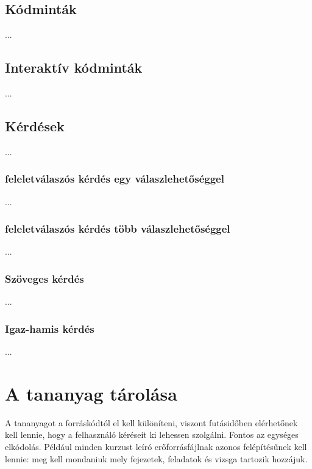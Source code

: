 \documentclass[12pt,a4paper]{article}
\begin{document}
	\subsection{Kódminták}
	
	...
	
	
	\subsection{Interaktív kódminták}
	
	...
	
	
	\subsection{Kérdések}\label{kerdesek}
	
	...
	
	\subsubsection{feleletválaszós kérdés egy válaszlehetőséggel}
	
	...
	
	\subsubsection{feleletválaszós kérdés több válaszlehetőséggel}
	
	...
	
	\subsubsection{Szöveges kérdés}
	
	...
	
	\subsubsection{Igaz-hamis kérdés}
	
	...
	
	\section{A tananyag tárolása}\label{tananyag_tarolasa}
	
	A tananyagot a forráskódtól el kell különíteni, viszont futásidőben elérhetőnek kell lennie, hogy a felhasználó kéréseit ki lehessen szolgálni. Fontos az egységes elkódolás. Például minden kurzust leíró erőforrásfájlnak azonos felépítésűnek kell lennie: meg kell mondaniuk mely fejezetek, feladatok és vizsga tartozik hozzájuk.
	
\end{document}
